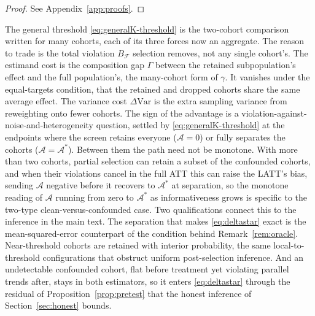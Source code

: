 \documentclass[12pt]{article}
\theoremstyle{remark}
\begin{document}
\begin{proof}
See Appendix~\ref{app:proofs}.
\end{proof}

The general threshold \eqref{eq:generalK-threshold} is the two-cohort comparison written for many
cohorts, each of its three forces now an aggregate. The reason to trade is the total violation
$B_{\mathcal F}$ selection removes, not any single cohort's. The estimand cost is the composition gap
$\Gamma$ between the retained subpopulation's effect and the full population's, the many-cohort form of
$\gamma$. It vanishes under the equal-targets condition, that the retained and dropped cohorts share the
same average effect. The variance
cost $\Delta\mathrm{Var}$ is the extra sampling variance from reweighting onto fewer cohorts. The sign of
the advantage is a violation-against-noise-and-heterogeneity question, settled by
\eqref{eq:generalK-threshold} at the endpoints where the screen retains everyone ($\mathcal{A}=0$) or fully
separates the cohorts ($\mathcal{A}=\mathcal{A}^\ast$). Between them the path need not be monotone. With more
than two cohorts, partial selection can retain a subset of the confounded cohorts, and when their violations
cancel in the full ATT this can raise the LATT's bias, sending $\mathcal{A}$ negative before it recovers to
$\mathcal{A}^\ast$ at separation, so the monotone reading of $\mathcal{A}$ running from zero to
$\mathcal{A}^\ast$ as informativeness grows is specific to the two-type clean-versus-confounded case. Two
qualifications connect this to the inference in the main text. The separation that makes
\eqref{eq:deltastar} exact is the mean-squared-error counterpart of the condition behind
Remark~\ref{rem:oracle}. Near-threshold cohorts are retained with interior probability, the same
local-to-threshold configurations that obstruct uniform post-selection inference. And an undetectable
confounded cohort, flat before treatment yet violating parallel trends after, stays in both estimators, so
it enters \eqref{eq:deltastar} through the residual of Proposition~\ref{prop:pretest} that the honest
inference of Section~\ref{sec:honest} bounds.
\end{document}
